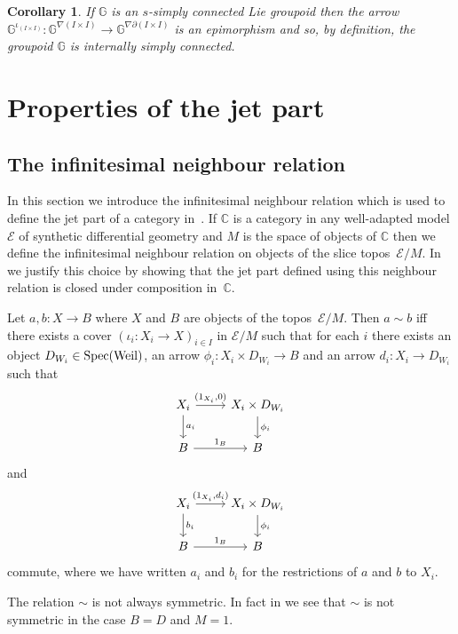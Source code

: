 \documentclass[10pt,a4paper]{amsart}
\numberwithin{equation}{section}
\newtheorem{Corollary}[Theorem]{Corollary}
\begin{document}
\begin{Corollary}If $\mathbb{G}$ is an $s$-simply connected Lie groupoid then the arrow $\mathbb{G}^{\iota_{(I\times I)}}\colon \mathbb{G}^{\nabla (I\times I)}\rightarrow \mathbb{G}^{\nabla\partial(I\times I)}$ is an epimorphism and so, by definition, the groupoid $\mathbb{G}$ is internally simply connected.
\end{Corollary}

\section{Properties of the jet part}

\subsection{The inf\/initesimal neighbour relation}\label{sec:infinitesimal-neighbour-relation}

In this section we introduce the inf\/initesimal neighbour relation which is used to def\/ine the jet part of a category in~\cite{burke-relative-to-local-models}. If $\mathbb{C}$ is a category in any well-adapted model $\mathcal{E}$ of synthetic dif\/ferential geometry and $M$ is the space of objects of $\mathbb{C}$ then we def\/ine the inf\/initesimal neighbour relation on objects of the slice topos~$\mathcal{E}/M$. In~\cite{burke-relative-to-local-models} we justify this choice by showing that the jet part def\/ined using this neighbour relation is closed under composition in~$\mathbb{C}$.

Let $a,b\colon X \rightarrow B$ where $X$ and $B$ are objects of the topos~$\mathcal{E}/M$. Then $a\sim b$ if\/f there exists a cover $(\iota_{i}\colon X_{i}\rightarrow X)_{i\in I}$ in ${\mathcal E}/M$ such that for each $i$ there exists an object $D_{W_{i}}\in {\rm Spec}({\rm Weil})$, an arrow $\phi_{i}\colon X_{i}\times D_{W_{i}}\rightarrow B$ and an arrow $d_{i}\colon X_{i}\rightarrow D_{W_{i}}$ such that
\begin{equation*}\begin{tikzcd}
X_{i} \dar{a_{i}} \rar{(1_{X_{i}},0)} & X_{i}\times D_{W_{i}} \dar{\phi_{i}} \\
B \rar{1_{B}} & B
\end{tikzcd}\end{equation*}
and
\begin{equation*}\begin{tikzcd}
X_{i} \dar{b_{i}} \rar{(1_{X_{i}},d_{i})} & X_{i}\times D_{W_{i}} \dar{\phi_{i}} \\
B \rar{1_{B}} & B
\end{tikzcd}\end{equation*}
commute, where we have written $a_i$ and $b_i$ for the restrictions of $a$ and $b$ to $X_i$.
\begin{Remark}
The relation $\sim$ is not always symmetric. In fact in \cite{burke-relative-to-local-models} we see that $\sim$ is not symmetric in the case $B=D$ and $M=1$.
\end{Remark}
\end{document}
